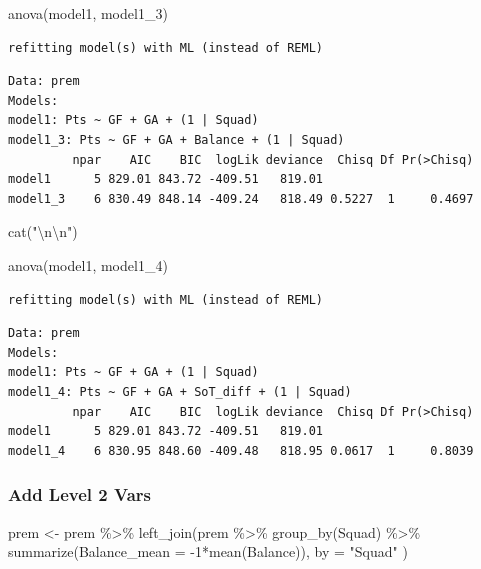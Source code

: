 \documentclass[
  letterpaper,
  DIV=11,
  numbers=noendperiod]{scrartcl}
\newenvironment{Shaded}{\begin{snugshade}}{\end{snugshade}}
\newcommand{\AttributeTok}[1]{\textcolor[rgb]{0.40,0.45,0.13}{#1}}
\newcommand{\DecValTok}[1]{\textcolor[rgb]{0.68,0.00,0.00}{#1}}
\newcommand{\FunctionTok}[1]{\textcolor[rgb]{0.28,0.35,0.67}{#1}}
\newcommand{\NormalTok}[1]{\textcolor[rgb]{0.00,0.23,0.31}{#1}}
\newcommand{\OtherTok}[1]{\textcolor[rgb]{0.00,0.23,0.31}{#1}}
\newcommand{\SpecialCharTok}[1]{\textcolor[rgb]{0.37,0.37,0.37}{#1}}
\newcommand{\StringTok}[1]{\textcolor[rgb]{0.13,0.47,0.30}{#1}}
\begin{document}
\begin{Shaded}
\begin{Highlighting}[]
\FunctionTok{anova}\NormalTok{(model1, model1\_3)}
\end{Highlighting}
\end{Shaded}

\begin{verbatim}
refitting model(s) with ML (instead of REML)
\end{verbatim}

\begin{verbatim}
Data: prem
Models:
model1: Pts ~ GF + GA + (1 | Squad)
model1_3: Pts ~ GF + GA + Balance + (1 | Squad)
         npar    AIC    BIC  logLik deviance  Chisq Df Pr(>Chisq)
model1      5 829.01 843.72 -409.51   819.01                     
model1_3    6 830.49 848.14 -409.24   818.49 0.5227  1     0.4697
\end{verbatim}

\begin{Shaded}
\begin{Highlighting}[]
\FunctionTok{cat}\NormalTok{(}\StringTok{"}\SpecialCharTok{\textbackslash{}n\textbackslash{}n}\StringTok{"}\NormalTok{)}
\end{Highlighting}
\end{Shaded}

\begin{Shaded}
\begin{Highlighting}[]
\FunctionTok{anova}\NormalTok{(model1, model1\_4)}
\end{Highlighting}
\end{Shaded}

\begin{verbatim}
refitting model(s) with ML (instead of REML)
\end{verbatim}

\begin{verbatim}
Data: prem
Models:
model1: Pts ~ GF + GA + (1 | Squad)
model1_4: Pts ~ GF + GA + SoT_diff + (1 | Squad)
         npar    AIC    BIC  logLik deviance  Chisq Df Pr(>Chisq)
model1      5 829.01 843.72 -409.51   819.01                     
model1_4    6 830.95 848.60 -409.48   818.95 0.0617  1     0.8039
\end{verbatim}

\subsubsection{Add Level 2 Vars}\label{add-level-2-vars}

\begin{Shaded}
\begin{Highlighting}[]
\NormalTok{prem }\OtherTok{\textless{}{-}}\NormalTok{ prem }\SpecialCharTok{\%\textgreater{}\%}
  \FunctionTok{left\_join}\NormalTok{(prem }\SpecialCharTok{\%\textgreater{}\%}
              \FunctionTok{group\_by}\NormalTok{(Squad) }\SpecialCharTok{\%\textgreater{}\%}
              \FunctionTok{summarize}\NormalTok{(}\AttributeTok{Balance\_mean =} \SpecialCharTok{{-}}\DecValTok{1}\SpecialCharTok{*}\FunctionTok{mean}\NormalTok{(Balance)),}
            \AttributeTok{by =} \StringTok{"Squad"}
\NormalTok{  )}
\end{Highlighting}
\end{Shaded}
\end{document}
